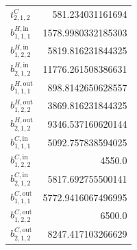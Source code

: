 \documentclass{article}%
\begin{document}
\begin{multicols*}{3}
\begin{supertabular}{lr}
	$t_{2,1,2}^{C}$ & 581.234031161694 \\%
	$b_{1,1,1}^{H,\text{in}}$ & 1578.9980332185303 \\%
	$b_{1,2,2}^{H,\text{in}}$ & 5819.816231844325 \\%
	$b_{2,1,2}^{H,\text{in}}$ & 11776.261508386631 \\%
	$b_{1,1,1}^{H,\text{out}}$ & 898.8142650628557 \\%
	$b_{1,2,2}^{H,\text{out}}$ & 3869.816231844325 \\%
	$b_{2,1,2}^{H,\text{out}}$ & 9346.537160620144 \\%
	$b_{1,1,1}^{C,\text{in}}$ & 5092.757838594025 \\%
	$b_{1,2,2}^{C,\text{in}}$ & 4550.0 \\%
	$b_{2,1,2}^{C,\text{in}}$ & 5817.692755500141 \\%
	$b_{1,1,1}^{C,\text{out}}$ & 5772.9416067496995 \\%
	$b_{1,2,2}^{C,\text{out}}$ & 6500.0 \\%
	$b_{2,1,2}^{C,\text{out}}$ & 8247.417103266629 \\%
\end{supertabular}%
\end{multicols*}%
\clearpage%
\end{document}
